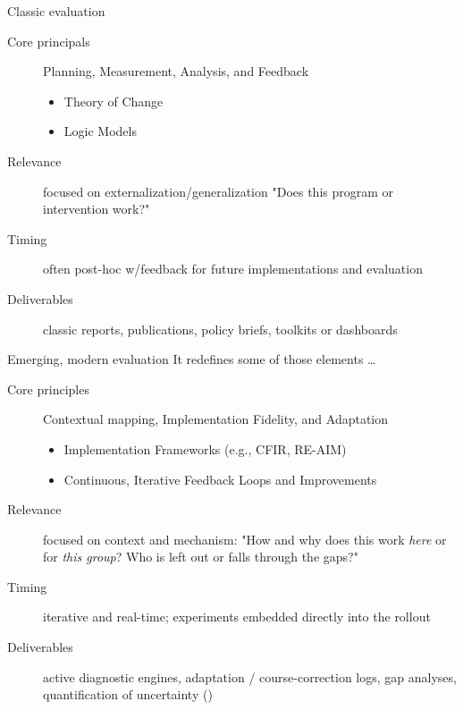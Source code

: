 \documentclass[aspectratio=169, 10pt]{beamer}
\begin{document}
\begin{frame}{Classic evaluation}

\begin{description}
\item[Core principals] Planning, Measurement, Analysis, and Feedback
	\begin{itemize}
	 \item Theory of Change
	 \item Logic Models
	\end{itemize} \pause
\item[Relevance] focused on externalization/generalization "Does this program or intervention work?"
\item[Timing] often post-hoc w/feedback for future implementations and evaluation
\item[Deliverables] classic reports, publications, policy briefs, toolkits or dashboards
\end{description}
 
\end{frame}

\begin{frame}{Emerging, modern evaluation}
It redefines some of those elements \ldots
\vspace{1em}
\begin{description}
\item[Core principles] Contextual mapping, Implementation Fidelity, and Adaptation
	\begin{itemize}
	 \item Implementation Frameworks (e.g., CFIR, RE-AIM)
	 \item Continuous, Iterative Feedback Loops and Improvements
	\end{itemize} \pause
\item[Relevance] focused on context and mechanism: "How and why does this work \textit{here} or for \textit{this group}? Who is left out or falls through the gaps?"
\item[Timing] iterative and real-time; experiments embedded directly into the rollout
\item[Deliverables] active diagnostic engines, adaptation / course-correction logs, gap analyses, quantification of uncertainty ()
\end{description}
\pause
\vfill
\begin{quote} \centering \color{TXOrange}{Applied evaluation is no longer just an external, 3rd party audit... \\ it is a strategic partnership in the implementation lifecycle.} \end{quote}  
\end{frame}
\end{document}
